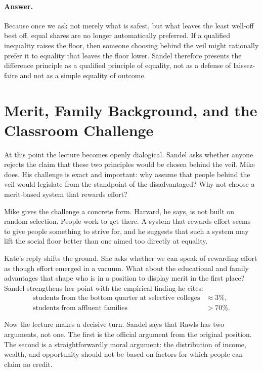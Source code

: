 \paragraph{Answer.} Because once we ask not merely what is safest, but what leaves the least well-off best off, equal shares are no longer automatically preferred. If a qualified inequality raises the floor, then someone choosing behind the veil might rationally prefer it to equality that leaves the floor lower. Sandel therefore presents the difference principle as a qualified principle of equality, not as a defense of laissez-faire and not as a simple equality of outcome.

\section{Merit, Family Background, and the Classroom Challenge}

At this point the lecture becomes openly dialogical. Sandel asks whether anyone rejects the claim that these two principles would be chosen behind the veil. Mike does. His challenge is exact and important: why assume that people behind the veil would legislate from the standpoint of the disadvantaged? Why not choose a merit-based system that rewards effort?

Mike gives the challenge a concrete form. Harvard, he says, is not built on random selection. People work to get there. A system that rewards effort seems to give people something to strive for, and he suggests that such a system may lift the social floor better than one aimed too directly at equality.

Kate's reply shifts the ground. She asks whether we can speak of rewarding effort as though effort emerged in a vacuum. What about the educational and family advantages that shape who is in a position to display merit in the first place? Sandel strengthens her point with the empirical finding he cites:
\begin{align}
\text{students from the bottom quarter at selective colleges} &\approx 3\%,\\
\text{students from affluent families} &> 70\%.
\end{align}

Now the lecture makes a decisive turn. Sandel says that Rawls has two arguments, not one. The first is the official argument from the original position. The second is a straightforwardly moral argument: the distribution of income, wealth, and opportunity should not be based on factors for which people can claim no credit.

